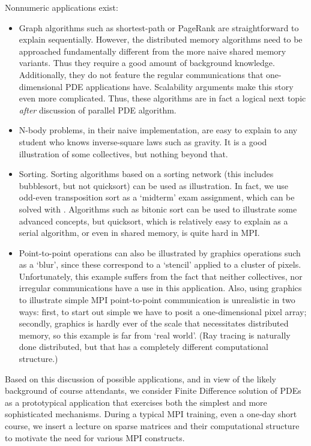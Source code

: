 Nonnumeric applications exist:
\begin{itemize}
\item Graph algorithms such as shortest-path or PageRank are 
  straightforward to explain sequentially.
  However, the distributed memory algorithms need to
  be approached fundamentally different from the more naive shared
  memory variants. Thus they require a good amount of background
  knowledge. Additionally, they do not feature the regular
  communications that one-dimensional PDE applications
  have. Scalability arguments make this story even more
  complicated. Thus, these algorithms are in fact a logical next topic
  \emph{after} discussion of parallel PDE algorithm.
\item N-body problems, in their naive implementation, are easy to
  explain to any student who knows inverse-square laws such as
  gravity. It is a good illustration of some collectives, but nothing
  beyond that.
\item Sorting. Sorting algorithms based on a sorting network (this
  includes bubblesort, but not quicksort) can be used as
  illustration. In fact, we use odd-even transposition sort as a
  `midterm' exam assignment, which can be solved with
  . Algorithms such as bitonic sort can be used to
  illustrate some advanced concepts, but quicksort, which is
  relatively easy to explain as a serial algorithm, or even in shared
  memory, is quite hard in \ac{MPI}.
\item Point-to-point operations can also be illustrated by graphics
  operations such as a `blur', since these correspond to a `stencil'
  applied to a cluster of pixels. Unfortunately, this example suffers
  from the fact that neither collectives, nor irregular communications
  have a use in this application. Also, using graphics to illustrate
  simple \ac{MPI} point-to-point communication is unrealistic in two
  ways: first, to start out simple we have to posit a one-dimensional
  pixel array; secondly, graphics is hardly ever of the scale that
  necessitates distributed memory, so this example is far from `real
  world'. (Ray tracing is naturally done distributed, but that has a
  completely different computational structure.)
\end{itemize}

Based on this discussion of possible applications, and in view of the
likely background of course attendants, we consider Finite Difference
solution of \acp{PDE} as a prototypical application that exercises
both the simplest and more sophisticated mechanisms. During a typical
MPI training, even a one-day short course, we insert a lecture on
sparse matrices and their computational structure to motivate the need
for various MPI constructs.

